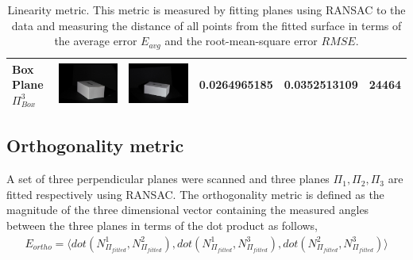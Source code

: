 \documentclass[final,12pt,3p]{elsarticle}
\begin{document}
\begin{table}[!ht]
{\begin{tabular}{| l | >{\centering\arraybackslash} m{2.5cm} | >{\centering\arraybackslash} m{2.5cm} | c | c | c |}
   Box Plane $\Pi_{Box}^{3}$ & \includegraphics[scale=0.05]{./images/box_cam1.JPG} & \includegraphics[scale=0.05]{./images/box_cam2.JPG} & 0.0264965185	& 0.0352513109 & 24464\\
   \hline  
\end{tabular}
}
  \caption{\label{tab:metric1} Linearity metric. This metric is measured by fitting planes using RANSAC to the data and measuring the distance of all points from the fitted surface in terms of the average error $E_{avg}$ and the root-mean-square error $RMSE$.}
  \end{table}

\subsection{Orthogonality metric}
A set of three perpendicular planes were scanned and three planes $\Pi_{1}, \Pi_{2}, \Pi_{3}$ are fitted respectively using RANSAC. The orthogonality metric is defined as the magnitude of the three dimensional vector containing the measured angles between the three planes in terms of the dot product as follows,
\begin{multline}
	E_{ortho} = \langle dot(N_{\Pi_{fitted}}^1, N_{\Pi_{fitted}}^2), dot(N_{\Pi_{fitted}}^1, N_{\Pi_{fitted}}^3), dot(N_{\Pi_{fitted}}^2, N_{\Pi_{fitted}}^3) \rangle
\end{multline}
\end{document}
